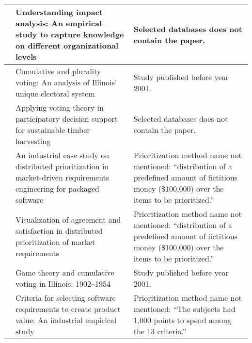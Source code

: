 {\begin{tabular}{
|>{\raggedright}p{}
|>{\raggedright}p{}
|>{\raggedright}p{}
|}
\citet{Jonsson2005a} & Understanding impact analysis: An empirical study to capture knowledge on different organizational levels &
Selected databases does not contain the paper.
\tabularnewline \hline

\citet{Kuklinski1973} & Cumulative and plurality voting: An analysis of Illinois' unique electoral system &
Study published before year 2001.
\tabularnewline \hline

\citet{Laukkanen2004} & Applying voting theory in participatory decision support for sustainable timber harvesting &
Selected databases does not contain the paper.
\tabularnewline \hline

\citet{Regnell2001} & An industrial case study on distributed prioritization in market-driven requirements engineering for packaged software &
Prioritization method name not mentioned: ``distribution of a predefined amount of fictitious money (\$100,000) over the items to be prioritized.''
\tabularnewline \hline

\citet{Regnell2000} & Visualization of agreement and satisfaction in distributed prioritization of market requirements &
Prioritization method name not mentioned: ``distribution of a predefined amount of fictitious money (\$100,000) over the items to be prioritized.''
\tabularnewline \hline

\citet{Sawyer1962} & Game theory and cumulative voting in Illinois: 1902--1954 &
Study published before year 2001.
\tabularnewline \hline

\citet{Wohlin2006} & Criteria for selecting software requirements to create product value: An industrial empirical study &
Prioritization method name not mentioned: ``The subjects had 1,000 points to spend among the 13 criteria.''
\tabularnewline \hline

\end{tabular}
}
